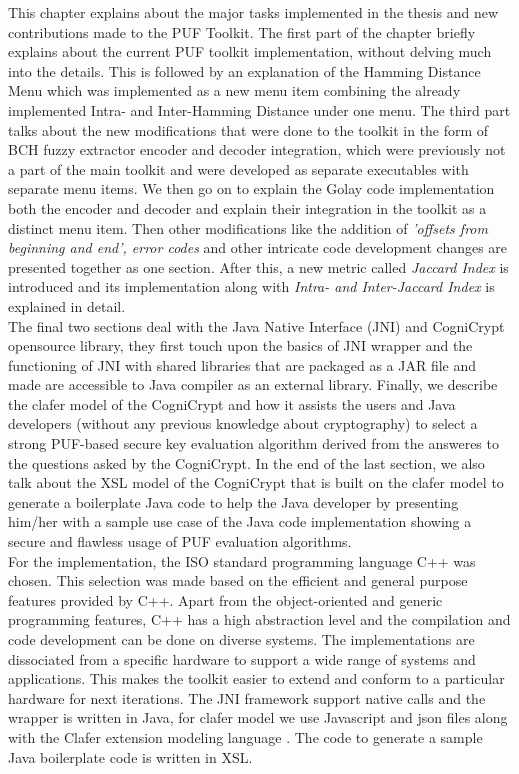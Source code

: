 This chapter explains about the major tasks implemented in the thesis and new contributions made to the PUF Toolkit. The first part of the chapter briefly explains about the current PUF toolkit implementation, without delving much into the details. This is followed by an explanation of the Hamming Distance Menu which was implemented as a new menu item combining the already implemented Intra- and Inter-Hamming Distance under one menu. The third part talks about the new modifications that were
done to the toolkit in the form of BCH fuzzy extractor encoder and decoder integration, which were previously not a part of the main toolkit and were developed as separate executables
with separate menu items. We then go on to explain the Golay code implementation both the encoder and decoder and explain their integration in the toolkit as a distinct menu item. Then other modifications like the addition of \emph{'offsets from beginning and end', error codes} and other intricate code development changes are presented together as one section. After this, a new metric called \emph{Jaccard Index} is introduced and its implementation along with \emph{Intra- and
Inter-Jaccard Index} is explained in detail.\\

The final two sections deal with the Java Native Interface (JNI) and CogniCrypt opensource library, they first touch upon the basics of JNI
wrapper and the functioning of JNI with shared libraries that are packaged as a JAR file and made are accessible to Java compiler as an external library. Finally, we describe the clafer model of the CogniCrypt and how it assists the users and Java developers (without any previous knowledge about cryptography) to select a strong PUF-based secure key evaluation algorithm derived from the answeres to the questions asked by the CogniCrypt. In the end of the last section, we also talk about the XSL
model of the CogniCrypt that is built on
the clafer model to generate a boilerplate Java code to help the Java developer by presenting him/her with a sample use case of the Java code implementation showing a secure and flawless usage of PUF evaluation algorithms.\\

For the implementation, the ISO standard programming language C++ was chosen. This selection was made based on the efficient and general purpose features provided by C++. Apart from the object-oriented and generic programming features, C++ has a high abstraction level and the compilation and code development can be done on diverse systems. The implementations are dissociated from a specific hardware to support a wide range of systems and applications. This makes the toolkit easier
to extend and conform to a particular hardware for next iterations. The JNI framework support native calls and the wrapper is written in Java, for clafer model we use Javascript and json files along with the Clafer extension modeling language \cite{clafer}. The code to generate a sample Java boilerplate code is written in XSL.\\

